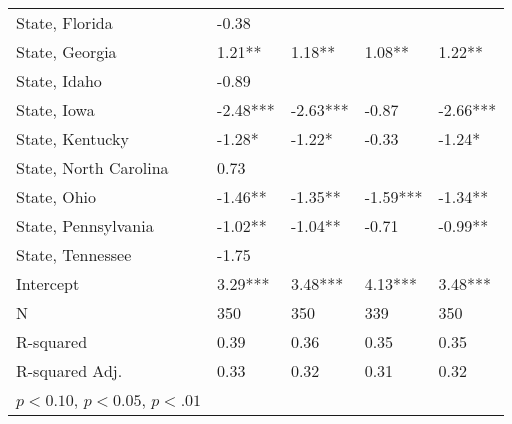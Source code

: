 {\begin{tabular}{lllll}
    State, Florida                         & -0.38    &          &          &          \\
    State, Georgia                         & 1.21**   & 1.18**   & 1.08**   & 1.22**   \\
    State, Idaho                           & -0.89    &          &          &          \\
    State, Iowa                            & -2.48*** & -2.63*** & -0.87    & -2.66*** \\
    State, Kentucky                        & -1.28*   & -1.22*   & -0.33    & -1.24*   \\
    State, North Carolina                  & 0.73     &          &          &          \\
    State, Ohio                            & -1.46**  & -1.35**  & -1.59*** & -1.34**  \\
    State, Pennsylvania                    & -1.02**  & -1.04**  & -0.71    & -0.99**  \\
    State, Tennessee                       & -1.75    &          &          &          \\
    Intercept                              & 3.29***  & 3.48***  & 4.13***  & 3.48***  \\
    \hline
    N                                      & 350      & 350      & 339      & 350      \\
    R-squared                              & 0.39     & 0.36     & 0.35     & 0.35     \\
    R-squared Adj.                         & 0.33     & 0.32     & 0.31     & 0.32     \\
    \hline
    \footnotesize \sym{*} \(p<0.10\), \sym{**} \(p<0.05\), \sym{***} \(p<.01\)

\end{tabular}
}
